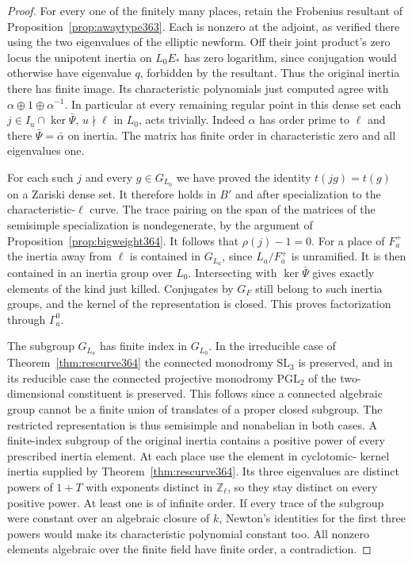 \documentclass[a4paper,11pt]{article}
\theoremstyle{definition}
\theoremstyle{remark}
\newcommand{\ZZ}{\mathbb Z}\newcommand{\ord}{\operatorname{ord}}
\numberwithin{equation}{section}
\begin{document}
\begin{proof}
For every one of the finitely many places, retain the
Frobenius resultant of Proposition~\ref{prop:awaytype363}.
Each is nonzero at the adjoint, as verified there using the
two eigenvalues of the elliptic newform. Off their joint
product's zero locus the unipotent inertia on \(L_0E_*\)
has zero logarithm, since conjugation would otherwise have
eigenvalue \(q\), forbidden by the resultant. Thus the
original inertia there has finite image. Its characteristic
polynomials just computed agree with
\(\alpha\oplus1\oplus\alpha^{-1}\). In particular at every
remaining regular point in this dense set each
\(j\in I_u\cap\ker\bar\Psi\), \(u\nmid\ell\) in \(L_0\),
acts trivially. Indeed \(\alpha\) has order prime to \(\ell\)
and there \(\bar\Psi=\bar\alpha\) on inertia. The matrix has
finite order in characteristic zero and all eigenvalues one.

For each such \(j\) and every \(g\in G_{L_0}\) we have proved
the identity \(t(jg)=t(g)\) on a Zariski dense set. It
therefore holds in \(B'\) and after specialization to the
characteristic-\(\ell\) curve. The trace pairing on the span
of the matrices of the semisimple specialization is
nondegenerate, by the argument of
Proposition~\ref{prop:bigweight364}. It follows that
\(\rho(j)-1=0\). For a place of \(F_a^+\) the inertia
away from \(\ell\) is contained in \(G_{L_a}\), since
\(L_a/F_a^+\) is unramified. It is then contained in an
inertia group over \(L_0\). Intersecting with
\(\ker\bar\Psi\) gives exactly elements of the kind just
killed. Conjugates by \(G_F\) still belong to such inertia
groups, and the kernel of the representation is closed.
This proves factorization through \(\Gamma_a^0\).

The subgroup \(G_{L_a}\) has finite index in \(G_{L_0}\).
In the irreducible case of Theorem~\ref{thm:rescurve364}
the connected monodromy \(\mathrm{SL}_3\) is preserved, and
in its reducible case the connected projective monodromy
\(\mathrm{PGL}_2\) of the two-dimensional constituent is
preserved. This follows since a connected algebraic group
cannot be a finite union of translates of a proper closed
subgroup. The restricted representation is thus semisimple
and nonabelian in both cases. A finite-index subgroup of the
original inertia contains a positive power of every prescribed
inertia element. At each place use the element in cyclotomic-
kernel inertia supplied by Theorem~\ref{thm:rescurve364}.
Its three eigenvalues are distinct powers of \(1+T\) with
exponents distinct in \(\ZZ_\ell\), so they stay distinct on
every positive power. At least one is of infinite order.
If every trace of the subgroup were constant over an
algebraic closure of \(k\), Newton's identities for the
first three powers would make its characteristic polynomial
constant too. All nonzero elements algebraic over the finite
field have finite order, a contradiction.
\end{proof}
\end{document}
